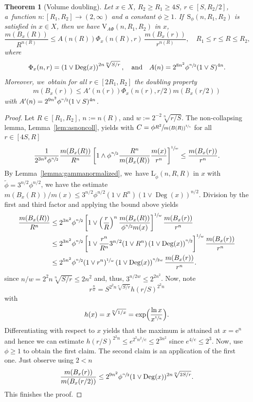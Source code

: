 \documentclass[10pt]{amsart}
\newcommand{\rS}{\mathrm{S}}
\newcommand{\rV}{\mathrm{V}}
\newcommand{\rL}{\mathrm{L}}
\theoremstyle{plain}
\newtheorem{theorem}{Theorem}[section]
\theoremstyle{definition}
\newcommand{\euler}{\mathrm{e}}
\DeclareMathOperator{\Deg}{Deg}
\begin{document}
\begin{theorem}[Volume doubling]\label{thm:adapteddoubling} Let $x\in X$, $R_2\geq R_1\geq 4S$, $r\in[S,R_2/2]$, a~function $n:[R_{1},R_{2}]\to (2,\infty)$ and a constant $\phi\geq 1$. If~$\rS_{\phi}(n,R_1,R_2)$ is satisfied in $x\in X$, then we have $\rV_{\!A\Phi}(n,R_1,R_2)$ in $x$, \ie
\[
\frac{m(B_x(R))}{R^{n(R)}}
\leq {A(n(R))} \Phi_x(n(R),r)\ \frac{m(B_x(r))}{r^{n(R)}}, \quad R_1\leq r\leq R\leq R_2,
\]
where
\[
\Phi_x(n,r)=\left(1\vee\Deg(x)\right)^{2n\sqrt[n]{S/r}},\quad\mbox{and}\quad A(n)=2^{8n^2}\phi^{\sfrac{n}{2}}(1\vee S)^{4n}.
\]
Moreover, we~obtain for all $r\in[2R_1,R_2]$ the doubling property
\begin{align*}
m(B_x(r))\leq {A'(n(r))} \Phi_x(n(r),r/2) m(B_{x}(r/2))
\end{align*}
with $ A'(n)=2^{9n^2}\phi^{\sfrac{n}{2}}(1\vee S)^{4n} $.
\end{theorem}

\begin{proof}
Let $R\in[R_1,R_2]$, $n:=n(R)$, and $w:=2^{-2}\sqrt[n]{r/S}$. The non-collapsing lemma, Lemma~\ref{lem:asnoncoll}, yields with $C=\phi\sfrac{R^{2}}{m(B(R))^{\sfrac{2}{n}}}$ for all $r\in [ 4S,R]$
\[
\frac{1}{2^{{3}n^2}\phi^{\sfrac{n}{2}}}\frac{m(B_x(R))}{R^{n}}
\left[1\wedge \phi^{\sfrac{n}{2}}\frac{R^{n}}{m(B_x(R))}\frac{m(x)}{r^{n}}\right] ^{\sfrac{1}{w}}
\leq \frac{m(B_x(r))}{r^{n}}.
\]
By Lemma~\ref{lemma:gammanormalized}, we~have $\rL_{\tilde\phi}(n,R,R)$ in $x$ with $\tilde \phi={3}^{n{/2}}\phi^{n{/2}}$, \ie we have the estimate ${{m(B_x(R))}/{m(x)}
\leq {3}^{n{/2}}\phi^{n/2}(1\vee R^n)\left(1\vee\Deg(x)\right)^{{n}/{2}}}$.
Division by the first and third factor and applying the bound above yields
\begin{align*}
\frac{m(B_x(R))}{R^{n}}
&\leq
2^{{3}n^2}
\phi^{\sfrac{n}{2}}
\left[1\vee \left(\frac{r}{R}\right)^{n} {\frac{m(B_x(R))}{\phi^{\sfrac{n}{2}}m(x)}}\right]^{\sfrac{1}{w}}\frac{m(B_x(r))}{r^{n}}
\\
&\leq
2^{{3}n^2}
\phi^{\sfrac{n}{2}}
\left[1\vee \frac{{r}^{n}}{R^{n}}
{3}^{n{/2}}(1\vee R^n)\left(1\vee\Deg(x)\right)^{\sfrac{n}{2}}
\right]^{\sfrac{1}{w}}\frac{m(B_x(r))}{r^{n}}
\\
&\leq
2^{{5}n^2}
\phi^{\sfrac{n}{2}} (1\vee r^n)^{\sfrac{1}{w}}
\left(1\vee\Deg(x)\right)
^{\sfrac{n}{2w}}\frac{m(B_x(r))}{r^{n}}.
\end{align*}
since $ n/w= 2^2n\sqrt[n]{S/r} \leq 2n^2$ and, thus, $ {3}^{n/{2}w} \leq 2^{2n^2}$.
Now, note
\[
r^{\frac{n}{w}}=S^{2^2n\sqrt[n]{S/r}}h(r/S)^{2^2n}
\]
with
\[
h(x)=x^{\sqrt[n]{1/x}}=\exp\Bigl(\frac{\ln x}{x^{\sfrac{1}{n}}}\Bigr).
\]
Differentiating with respect to $ x $ yields that the maximum is attained at $ x= \euler^{n}$ and hence we can estimate $ h(r/S)^{2^2n}\leq e^{2^2n^2/e}\leq 2^{3n^2} $ since $ e^{{4/e}}\leq 2^3 $. Now, use $\phi\geq 1$ to obtain the first claim.
The second claim is an application of the first one.
Just observe using $2<n$
\[
\frac
{m(B_x(r))}
{m(B_x(r/2))}\leq
2^{9n^2}\phi^{\sfrac{n}{2}}(1\vee\Deg(x))^{2n\sqrt[n]{2S/r}}.
\]
This finishes the proof.
\end{proof}
\end{document}
